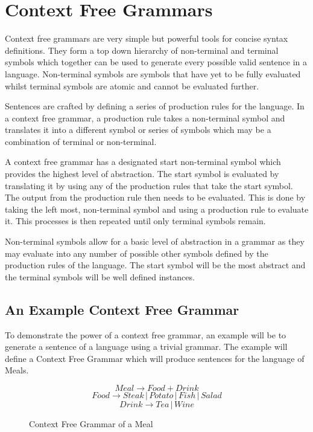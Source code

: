 \section{Context Free Grammars}

Context free grammars are very simple but powerful tools for concise syntax definitions.  They form a top down hierarchy of non-terminal and terminal symbols which together can be used to generate every possible valid sentence in a language.  Non-terminal symbols are symbols that have yet to be fully evaluated whilst terminal symbols are atomic and cannot be evaluated further. 


Sentences are crafted by defining a series of production rules for the language.  In a context free grammar, a production rule takes a non-terminal symbol and translates it into a different symbol or series of symbols which may be a combination of terminal or non-terminal. 



A context free grammar has a designated start non-terminal symbol which provides the highest level of abstraction.  The start symbol is evaluated by translating it by using any of the production rules that take the start symbol.  The output from the production rule then needs to be evaluated.
This is done by taking the left most, non-terminal symbol and using a production rule to evaluate it.  This processes is then repeated until only terminal symbols remain. 

Non-terminal symbols allow for a basic level of abstraction in a grammar as they may evaluate into any number of possible other symbols defined by the production rules of the language.  The start symbol will be the most abstract and the terminal symbols will be well defined instances. 

\subsection{An Example Context Free Grammar}

To demonstrate the power of a context free grammar, an example will be  to generate a sentence of a language using a trivial grammar.  The example will  define a Context Free Grammar which will produce sentences for the language of Meals.  

\begin{figure}[H]
\[ Meal \to Food + Drink \]
\[ Food \to Steak \,|\, Potato \,|\, Fish \,|\, Salad \]
\[ Drink \to Tea \,|\, Wine \]

\caption{Context Free Grammar of a Meal}
\end{figure}

